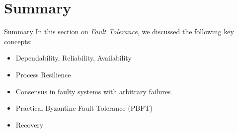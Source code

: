 \section{Summary}
  \begin{slide}{Summary}
    In this section on \emph{Fault Tolerance},
    we discussed the following key concepts:
    \begin{itemize}
      \item Dependability, Reliability, Availability
      \item Process Resilience
      \item Consensus in faulty systems with arbitrary failures
      \item Practical Byzantine Fault Tolerance (PBFT) 
      \item Recovery
    \end{itemize}
  \end{slide}
